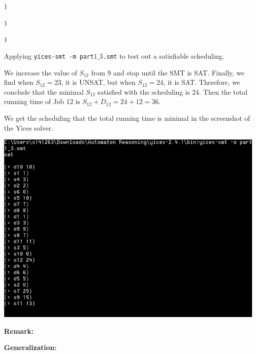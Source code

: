 \documentclass[11pt]{article}
\begin{document}
{\tt )}

{\tt )}

{\tt )}

\vspace{3mm}

Applying {\tt yices-smt -m part$1\_3$.smt} to test out a satisfiable scheduling.

We increase the value of $S_{12}$ from 9 and stop until the SMT is SAT. Finally, we find when $S_{12} = 23$, it is UNSAT, but when $S_{12} = 24$, it is SAT. Therefore, we conclude that the minimal $S_{12}$ satisfied with the scheduling is 24. Then the total running time of Job 12 is $S_{12} + D_12 = 24 + 12 = 36$.

We get the scheduling that the total running time is minimal in the screenshot of the Yices solver.
\begin{center}
\includegraphics[width=1.0\textwidth]{Part1_3.png}
\end{center}

{\bf Remark:}

\vspace{3mm}

{\bf Generalization:}

\vspace{5mm}


\end{document}
